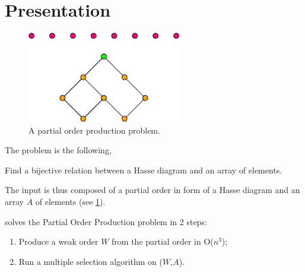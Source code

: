 \section{Presentation}
\label{tree:POP:presentation}

\begin{figure}
	\centering
	\includegraphics[width=0.6\textwidth]{fig/partial-order-production:diag}
	\caption{\label{fig:partial-order-production:diag} A partial order production problem.}
\end{figure}

The problem is the following,

Find a bijective relation between a Hasse diagram and an array of elements.

The input is thus composed of a partial order in form of a Hasse diagram and an array $A$ of elements (see \ref{fig:partial-order-production:diag}).

\cite{jcardin1} solves the Partial Order Production problem in 2 steps:

\begin{enumerate}
\item Produce a weak order $W$ from the partial order in O($n^3$);
\item Run a multiple selection algorithm on ($W$,$A$).
\end{enumerate}